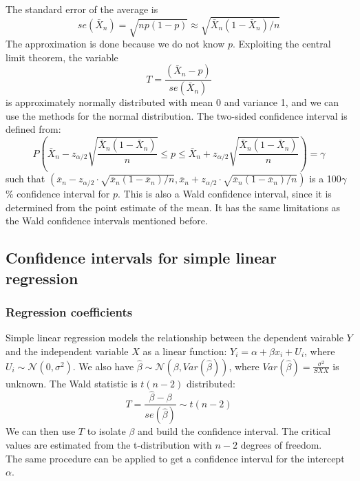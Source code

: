 \begin{itemize}
    The standard error of the average is
    \begin{equation*}
        se(\bar{X}_n) = \sqrt{np(1-p)} \approx \sqrt{\bar{X}_n (1-\bar{X}_n)/n}
    \end{equation*}
    The approximation is done because we do not know $p$. Exploiting the central limit theorem, the variable
    \begin{equation*}
        T = \frac{(\bar{X}_n - p)}{se(\bar{X}_n)}
    \end{equation*}
    is approximately normally distributed with mean 0 and variance 1, and we can use the methods for the normal distribution. The two-sided confidence interval is defined from:
    \begin{equation*}
        P\left(\bar{X}_n - z_{\alpha/2} \sqrt{\frac{\bar{X}_n (1-\bar{X}_n)}{n}} \leq p \leq \bar{X}_n + z_{\alpha/2} \sqrt{\frac{\bar{X}_n (1-\bar{X}_n)}{n}}\right) = \gamma
    \end{equation*}
    such that $(\bar{x}_n - z_{\alpha/2} \cdot \sqrt{\bar{x}_n (1-\bar{x}_n)/n}, \bar{x}_n + z_{\alpha/2} \cdot \sqrt{\bar{x}_n (1-\bar{x}_n)/n})$ is a 100$\gamma$\% confidence interval for $p$. This is also a Wald confidence interval, since it is determined from the point estimate of the mean. It has the same limitations as the Wald confidence intervals mentioned before.
\end{itemize}

\subsection{Confidence intervals for simple linear regression}

\subsubsection{Regression coefficients}

Simple linear regression models the relationship between the dependent vairable $Y$ and the independent variable $X$ as a linear function: $Y_i = \alpha + \beta x_i + U_i$, where $U_i \sim \mathcal{N}(0,\sigma^2)$. We also have $\hat{\beta} \sim \mathcal{N}(\beta, Var(\hat{\beta}))$, where $Var(\hat{\beta}) = \frac{\sigma^2}{SXX}$ is unknown. The Wald statistic is $t(n-2)$ distributed:
\begin{equation*}
    T = \frac{\hat{\beta} - \beta}{se(\hat{\beta})} \sim t(n-2)
\end{equation*}
We can then use $T$ to isolate $\beta$ and build the confidence interval. The critical values are estimated from the t-distribution with $n-2$ degrees of freedom. \\
The same procedure can be applied to get a confidence interval for the intercept $\alpha$.

